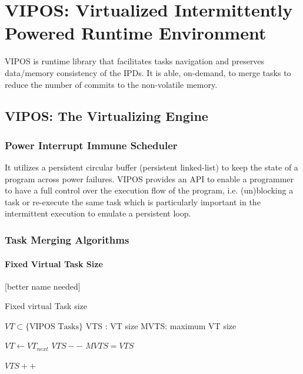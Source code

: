 \documentclass[sigconf,anonymous,review]{acmart}
\begin{document}
\section{VIPOS: Virtualized Intermittently Powered Runtime Environment}
VIPOS is runtime library that facilitates tasks navigation and preserves data/memory consistency of the IPDs. It is able, on-demand, to merge tasks to reduce the number of commits to the non-volatile memory.



\subsection{VIPOS: The Virtualizing Engine}
\subsubsection{Power Interrupt Immune Scheduler}
It utilizes a persistent circular buffer (persistent linked-list) to keep the state of a program across power failures. VIPOS provides an API to enable a programmer to have a full control over the execution flow of the program, i.e. (un)blocking a task or re-execute the same task which is particularly important in the intermittent execution to emulate a persistent loop. 

\subsubsection{Task Merging Algorithms}

\paragraph{Fixed Virtual Task Size} [better name needed]

	\begin{algorithm}[t]
		\caption{Fixed virtual Task size}
		\label{algo:fixVirtTask}
		\scriptsize
		\begin{algorithmic}[1]
			\State $VT \subset \text{\{VIPOS Tasks\}} $  
			\State VTS : VT size
			\State MVTS: maximum VT size
			\vspace{0.1cm}

				\State $VT \leftarrow VT_{next}$
				\vspace{0.1cm}
							\State $VTS--$  
							\State $ MVTS = VTS $
						\EndIf
				\EndWhile

				\vspace{0.1cm}
					\State $VTS++$
					\EndIf
				\EndIf
			\EndWhile
		\end{algorithmic}
	\end{algorithm}
\end{document}

